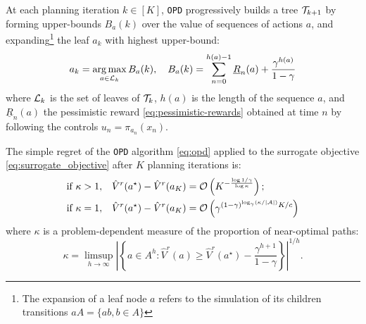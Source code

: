 \documentclass{article}
\begin{document}
At each planning iteration $k\in[K]$, \texttt{OPD} progressively builds a tree $\mathcal{T}_{k+1}$ by forming upper-bounds $B_a(k)$ over the value of sequences of actions $a$, and expanding\footnote{The expansion of a leaf node $a$ refers to the simulation of its children transitions $aA = \{ab, b\in A\}$} the leaf $a_k$ with highest upper-bound:
\begin{equation}
\label{eq:opd}
a_k = \operatorname*{arg\,max}_{a\in\mathcal{L}_k} B_a(k), \quad B_a(k) = \sum_{n=0}^{h(a)-1} \underline{R}_n(a) + \frac{\gamma^{h(a)}}{1-\gamma}
\end{equation}
where $\mathcal{L}_k$ is the set of leaves of $\mathcal{T}_k$, $h(a)$ is the length of the sequence $a$, and $\underline{R}_n(a)$ the pessimistic reward \eqref{eq:pessimistic-rewards} obtained at time $n$ by following the controls $u_n = \pi_{a_n}(x_n)$.
\begin{theorem}
\label{theorem:opd-regret}
The simple regret of the \texttt{OPD} algorithm \eqref{eq:opd} applied to the surrogate objective \eqref{eq:surrogate_objective} after $K$ planning iterations is:
\begin{align*}
\text{if } \kappa>1,\quad& 
\hat{V}^r(a^{\star}) - \hat{V}^r({a_K}) = \mathcal{O}\left(K^{-\frac{\log 1/\gamma}{\log \kappa}}\right);\\
\text{if }\kappa=1,\quad&
\hat{V}^r(a^{\star}) - \hat{V}^r({a_K}) = \mathcal{O}\left(\gamma^{{(1-\gamma)^{\log_\gamma (\kappa/|\mathcal{A}|)}}K/{c}}\right)
\end{align*}
where $\kappa$ is a problem-dependent measure of the proportion of near-optimal paths:
\[
\kappa = \limsup_{h\rightarrow\infty} \left|\left\{a\in A^h: \hat{V}^r(a)\geq \hat{V}^r(a^{\star}) - \frac{\gamma^{h+1}}{1-\gamma}\right\}\right|^{1/h}.
\]
\end{theorem}
\end{document}
